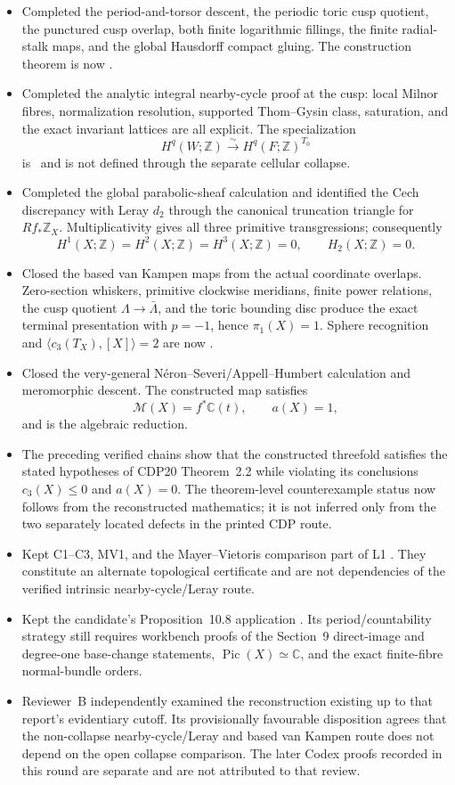 \begin{itemize}[leftmargin=1.8em]
\item Completed the period-and-torsor descent, the periodic toric cusp
quotient, the punctured cusp overlap, both finite logarithmic fillings, the
finite radial-stalk maps, and the global Hausdorff compact gluing.  The
construction theorem is now \Verified.
\item Completed the analytic integral nearby-cycle proof at the cusp:
local Milnor fibres, normalization resolution, supported Thom--Gysin class,
saturation, and the exact invariant lattices are all explicit.  The
specialization
\[
H^q(W;\mathbb Z)\xrightarrow{\sim}H^q(F;\mathbb Z)^{T_0}
\]
is \Verified\ and is not defined through the separate cellular collapse.
\item Completed the global parabolic-sheaf calculation and identified the
Cech discrepancy with Leray \(d_2\) through the canonical truncation
triangle for \(Rf_*\mathbb Z_X\).  Multiplicativity gives all three primitive
transgressions; consequently
\[
H^1(X;\mathbb Z)=H^2(X;\mathbb Z)=H^3(X;\mathbb Z)=0,
\qquad H_2(X;\mathbb Z)=0.
\]
\item Closed the based van Kampen maps from the actual coordinate overlaps.
Zero-section whiskers, primitive clockwise meridians, finite power relations,
the cusp quotient \(\Lambda\to\bar\Lambda\), and the toric bounding disc
produce the exact terminal presentation with \(p=-1\), hence
\(\pi_1(X)=1\).  Sphere recognition and
\(\langle c_3(T_X),[X]\rangle=2\) are now \Verified.
\item Closed the very-general N\'eron--Severi/Appell--Humbert calculation
and meromorphic descent.  The constructed map satisfies
\[
\mathcal M(X)=f^*\mathbb C(t),\qquad a(X)=1,
\]
and is the algebraic reduction.
\item The preceding verified chains show that the constructed threefold
satisfies the stated hypotheses of CDP20 Theorem~2.2 while violating its
conclusions \(c_3(X)\le0\) and \(a(X)=0\).  The theorem-level counterexample
status now follows from the reconstructed mathematics; it is not inferred
only from the two separately located defects in the printed CDP route.
\item Kept C1--C3, MV1, and the Mayer--Vietoris comparison part of L1
\Open.  They constitute an alternate topological certificate and are not
dependencies of the verified intrinsic nearby-cycle/Leray route.
\item Kept the candidate's Proposition~10.8 application \Conditional.
Its period/countability strategy still requires workbench proofs of the
Section~9 direct-image and degree-one base-change statements,
\(\operatorname{Pic}(X)\simeq\mathbb C\), and the exact finite-fibre
normal-bundle orders.
\item Reviewer~B independently examined the reconstruction existing up to
that report's evidentiary cutoff.  Its provisionally favourable disposition
agrees that the non-collapse nearby-cycle/Leray and based van Kampen route
does not depend on the open collapse comparison.  The later Codex proofs
recorded in this round are separate and are not attributed to that review.
\end{itemize}

